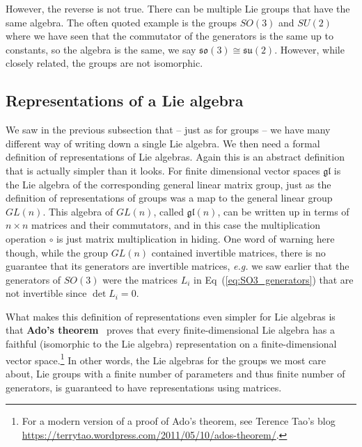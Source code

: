 \documentclass[notes.tex]{subfiles}
\begin{document}
However, the reverse is not true. There can be multiple Lie groups that have the same algebra. The often quoted example is the groups $SO(3)$ and $SU(2)$ where we have seen that the commutator of the generators is the same up to constants, so the algebra is the same, we say $\mathfrak{so(3)}\cong \mathfrak{su(2)}$. However, while closely related, the groups are not isomorphic. 


\subsection{Representations of a Lie algebra}
\label{sec:algebra_rep}

We saw in the previous subsection that -- just as for groups -- we have many different way of writing down a single Lie algebra. We then need a formal definition of representations of Lie algebras.
Again this is an abstract definition that is actually simpler than it looks. For finite dimensional vector spaces $\mathfrak{gl}$ is the Lie algebra of the corresponding general linear matrix group, just as the definition of representations of groups was a map to the general linear group $GL(n)$. This algebra of $GL(n)$, called $\mathfrak{gl}(n)$, can be written up in terms of $n\times n$ matrices and their commutators, and in this case the multiplication operation $\circ$ is just matrix multiplication in hiding. One word of warning here though, while the group $GL(n)$ contained invertible matrices, there is no guarantee that its generators are invertible matrices, {\it e.g.} we saw earlier that the generators of $SO(3)$ were the matrices $L_i$ in Eq~(\ref{eq:SO3_generators}) that are not invertible since $\det L_i=0$.

What makes this definition of representations even simpler for Lie algebras is that {\bf Ado's theorem}~\cite{Ado:1935} proves that every finite-dimensional Lie algebra has a faithful (isomorphic to the Lie algebra) representation on a finite-dimensional vector space.\footnote{For a modern version of a proof of Ado's theorem, see Terence Tao's blog \url{https://terrytao.wordpress.com/2011/05/10/ados-theorem/}.} In other words, the Lie algebras for the groups we most care about, Lie groups with a finite number of parameters and thus finite number of generators, is guaranteed to have representations using matrices.
\end{document}
